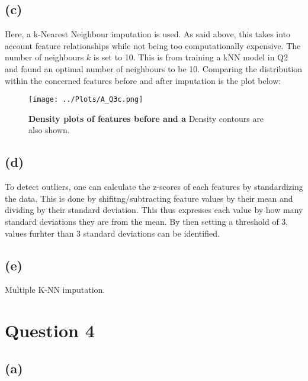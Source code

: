\documentclass[12pt]{report} %
\begin{document}
\subsection*{(c)}

Here, a k-Nearest Neighbour imputation is used. As said above, this takes into account feature relationships while not being too computationally expensive. The number of neighbours $k$ is set to 10. This is from training a kNN model in Q2 and found an optimal number of neighbours to be 10. Comparing the distribution within the concerned features before and after imputation is the plot below:


\begin{figure}[htbp]
    \centering
    \texttt{[image: ../Plots/A\_Q3c.png]}
    \caption{\textbf{Density plots of features before and a} Density contours are also shown.}
\end{figure}

\subsection*{(d)}

To detect outliers, one can calculate the z-scores of each features by standardizing the data. This is done by shifitng/subtracting feature values by their mean and dividing by their standard deviation\cite[p. 73]{sklearn_book}. This thus expresses each value by how many standard deviations they are from the mean. By then setting a threshold of 3, values furhter than 3 standard deviations can be identified.

\subsection*{(e)}

Multiple K-NN imputation.



\section*{Question 4}

\subsection*{(a)}
\end{document}
